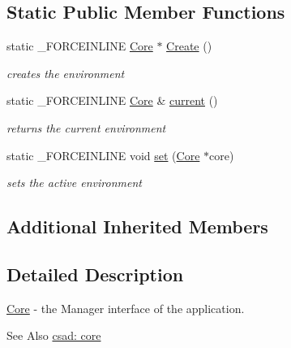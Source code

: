 \subsection*{Static Public Member Functions}
\begin{DoxyCompactItemize}
\item 
\hypertarget{classcsad_1_1_core_a7516bdeb9a403d71b5a05525ec60ac11}{static \-\_\-\-F\-O\-R\-C\-E\-I\-N\-L\-I\-N\-E \hyperlink{classcsad_1_1_core}{Core} $\ast$ \hyperlink{classcsad_1_1_core_a7516bdeb9a403d71b5a05525ec60ac11}{Create} ()}\label{classcsad_1_1_core_a7516bdeb9a403d71b5a05525ec60ac11}

\begin{DoxyCompactList}\small\item\em creates the environment \end{DoxyCompactList}\item 
\hypertarget{classcsad_1_1_core_a2cf4e6338c71fb343356c751fc85cadd}{static \-\_\-\-F\-O\-R\-C\-E\-I\-N\-L\-I\-N\-E \hyperlink{classcsad_1_1_core}{Core} \& \hyperlink{classcsad_1_1_core_a2cf4e6338c71fb343356c751fc85cadd}{current} ()}\label{classcsad_1_1_core_a2cf4e6338c71fb343356c751fc85cadd}

\begin{DoxyCompactList}\small\item\em returns the current environment \end{DoxyCompactList}\item 
\hypertarget{classcsad_1_1_core_a8d1bf53f8baa7c6c92e24528e31c2877}{static \-\_\-\-F\-O\-R\-C\-E\-I\-N\-L\-I\-N\-E void \hyperlink{classcsad_1_1_core_a8d1bf53f8baa7c6c92e24528e31c2877}{set} (\hyperlink{classcsad_1_1_core}{Core} $\ast$core)}\label{classcsad_1_1_core_a8d1bf53f8baa7c6c92e24528e31c2877}

\begin{DoxyCompactList}\small\item\em sets the active environment \end{DoxyCompactList}\end{DoxyCompactItemize}
\subsection*{Additional Inherited Members}


\subsection{Detailed Description}
\hyperlink{classcsad_1_1_core}{Core} -\/ the Manager interface of the application. 

\begin{DoxySeeAlso}{See Also}
\hyperlink{group__core}{csad\-: core} 
\end{DoxySeeAlso}
